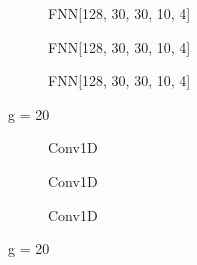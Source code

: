 \documentclass[a4paper,times,12pt]{article}
\begin{document}
\begin{figure}[H]
    \centering
    \begin{subfigure}[t]{0.45\textwidth}
		\centering
        
        \caption{FNN[128, 30, 30, 10, 4]}
		\label{fig:a}
    \end{subfigure}\hfill
    \begin{subfigure}[t]{0.45\textwidth}
		\centering
        
        \caption{FNN[128, 30, 30, 10, 4]}
		\label{fig:b}
    \end{subfigure}\hfill    
    \begin{subfigure}[t]{0.45\textwidth}
        \centering
        
        \caption{FNN[128, 30, 30, 10, 4]}
		\label{fig:c}
    \end{subfigure}
	\caption{g = 20}
\end{figure}


\begin{figure}[H]
    \centering
    \begin{subfigure}[t]{0.45\textwidth}
		\centering
        
        \caption{Conv1D}
		\label{fig:a}
    \end{subfigure}\hfill
    \begin{subfigure}[t]{0.45\textwidth}
		\centering
        
        \caption{Conv1D}
		\label{fig:b}
    \end{subfigure}\hfill    
    \begin{subfigure}[t]{0.45\textwidth}
        \centering
        
        \caption{Conv1D}
		\label{fig:c}
    \end{subfigure}
	\caption{g = 20}
\end{figure}
\end{document}
